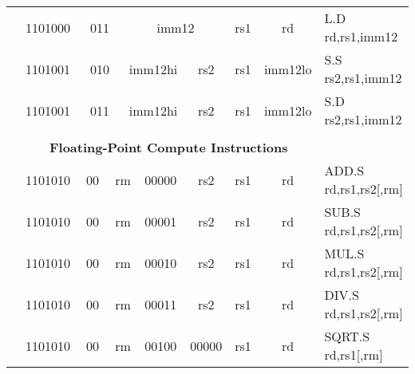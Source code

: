\begin{table}[p]
\begin{small}
\begin{center}
\begin{tabular}{rcccccccccl}
&
\multicolumn{1}{|c|}{1101000} &
\multicolumn{2}{c|}{011} &
\multicolumn{4}{c|}{imm12} &
\multicolumn{1}{c|}{rs1} &
\multicolumn{1}{c|}{rd} & L.D rd,rs1,imm12 \\
\cline{2-10}
  

&
\multicolumn{1}{|c|}{1101001} &
\multicolumn{2}{c|}{010} &
\multicolumn{3}{c|}{imm12hi} &
\multicolumn{1}{c|}{rs2} &
\multicolumn{1}{c|}{rs1} &
\multicolumn{1}{c|}{imm12lo} & S.S rs2,rs1,imm12 \\
\cline{2-10}
  

&
\multicolumn{1}{|c|}{1101001} &
\multicolumn{2}{c|}{011} &
\multicolumn{3}{c|}{imm12hi} &
\multicolumn{1}{c|}{rs2} &
\multicolumn{1}{c|}{rs1} &
\multicolumn{1}{c|}{imm12lo} & S.D rs2,rs1,imm12 \\
\cline{2-10}
  

&
\multicolumn{9}{c}{} & \\
&
\multicolumn{9}{c}{\bf Floating-Point Compute Instructions} & \\
\cline{2-10}
  

&
\multicolumn{1}{|c|}{1101010} &
\multicolumn{1}{c|}{00} &
\multicolumn{2}{c|}{rm} &
\multicolumn{2}{c|}{00000} &
\multicolumn{1}{c|}{rs2} &
\multicolumn{1}{c|}{rs1} &
\multicolumn{1}{c|}{rd} & ADD.S rd,rs1,rs2[,rm] \\
\cline{2-10}
  

&
\multicolumn{1}{|c|}{1101010} &
\multicolumn{1}{c|}{00} &
\multicolumn{2}{c|}{rm} &
\multicolumn{2}{c|}{00001} &
\multicolumn{1}{c|}{rs2} &
\multicolumn{1}{c|}{rs1} &
\multicolumn{1}{c|}{rd} & SUB.S rd,rs1,rs2[,rm] \\
\cline{2-10}
  

&
\multicolumn{1}{|c|}{1101010} &
\multicolumn{1}{c|}{00} &
\multicolumn{2}{c|}{rm} &
\multicolumn{2}{c|}{00010} &
\multicolumn{1}{c|}{rs2} &
\multicolumn{1}{c|}{rs1} &
\multicolumn{1}{c|}{rd} & MUL.S rd,rs1,rs2[,rm] \\
\cline{2-10}
  

&
\multicolumn{1}{|c|}{1101010} &
\multicolumn{1}{c|}{00} &
\multicolumn{2}{c|}{rm} &
\multicolumn{2}{c|}{00011} &
\multicolumn{1}{c|}{rs2} &
\multicolumn{1}{c|}{rs1} &
\multicolumn{1}{c|}{rd} & DIV.S rd,rs1,rs2[,rm] \\
\cline{2-10}
  

&
\multicolumn{1}{|c|}{1101010} &
\multicolumn{1}{c|}{00} &
\multicolumn{2}{c|}{rm} &
\multicolumn{2}{c|}{00100} &
\multicolumn{1}{c|}{00000} &
\multicolumn{1}{c|}{rs1} &
\multicolumn{1}{c|}{rd} & SQRT.S rd,rs1[,rm] \\
\cline{2-10}
  


\end{tabular}
\end{center}
\end{small}
\end{table}
